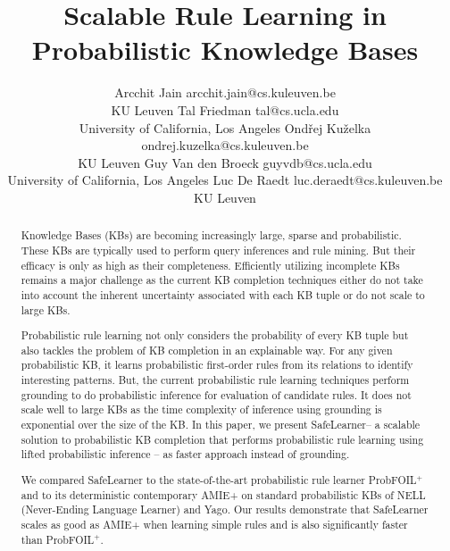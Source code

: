 \documentclass[akbc,twoside,11pt]{article}
\newcommand{\algorithmname}{SafeLearner\xspace}
\begin{document}
\title{Scalable Rule Learning in Probabilistic Knowledge Bases}

\author{\name Arcchit Jain \email arcchit.jain@cs.kuleuven.be\\\addr KU Leuven
       \AND \name Tal Friedman \email tal@cs.ucla.edu \\\addr University of California, Los Angeles
       \AND \name Ond\v{r}ej Ku\v{z}elka \email ondrej.kuzelka@cs.kuleuven.be \\\addr KU Leuven
       \AND \name Guy Van den Broeck \email guyvdb@cs.ucla.edu \\\addr University of California, Los Angeles
       \AND \name Luc De Raedt \email luc.deraedt@cs.kuleuven.be \\\addr KU Leuven}


\maketitle

\begin{abstract}
Knowledge Bases (KBs) are becoming increasingly large, sparse and probabilistic. These KBs are typically used to perform query inferences and rule mining. But their efficacy is only as high as their completeness. Efficiently utilizing incomplete KBs remains a major challenge as the current KB completion techniques either do not take into account the inherent uncertainty associated with each KB tuple or do not scale to large KBs.

Probabilistic rule learning not only considers the probability of every KB tuple but also tackles the problem of KB completion in an explainable way. For any given probabilistic KB, it learns probabilistic first-order rules from its relations to identify interesting patterns. But, the current probabilistic rule learning techniques perform grounding to do probabilistic inference for evaluation of candidate rules. It does not scale well to large KBs as the time complexity of inference using grounding is exponential over the size of the KB. In this paper, we present \algorithmname -- a scalable solution to probabilistic KB completion that performs probabilistic rule learning using lifted probabilistic inference -- as faster approach instead of grounding. 

We compared \algorithmname to the state-of-the-art probabilistic rule learner ProbFOIL$^+$ and to its deterministic contemporary AMIE+ on standard probabilistic KBs of NELL (Never-Ending Language Learner) and Yago. Our results demonstrate that \algorithmname scales as good as AMIE+ when learning simple rules and is also significantly faster than ProbFOIL$^+$. 
\end{abstract}
\end{document}
